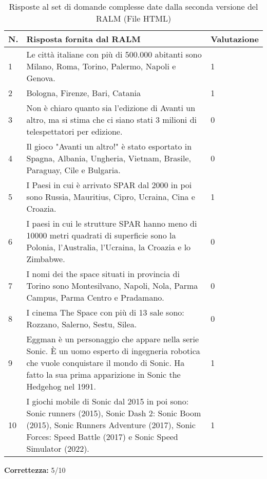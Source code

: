 \begin{table}[H]
    \centering
    \begin{tabular}{|p{0.5cm} |p{6cm} |p{2cm}|}
        \hline
        \textbf{N}. & \textbf{Risposta fornita dal RALM} & \textbf{Valutazione} \\
        \hline
        1 & Le città italiane con più di 500.000 abitanti sono Milano, Roma, Torino, Palermo, Napoli e Genova. & 1 \\
        \hline
        2 & Bologna, Firenze, Bari, Catania & 1 \\
        \hline
        3 & Non è chiaro quanto sia l'edizione di Avanti un altro, ma si stima che ci siano stati 3 milioni di telespettatori per edizione. & 0 \\
        \hline
        4 & Il gioco "Avanti un altro!" è stato esportato in Spagna, Albania, Ungheria, Vietnam, Brasile, Paraguay, Cile e Bulgaria. & 0 \\
        \hline
        5 & I Paesi in cui è arrivato SPAR dal 2000 in poi sono Russia, Mauritius, Cipro, Ucraina, Cina e Croazia. & 1 \\
        \hline
        6 & I paesi in cui le strutture SPAR hanno meno di 10000 metri quadrati di superficie sono la Polonia, l'Australia, l'Ucraina, la Croazia e lo Zimbabwe. & 0 \\
        \hline
        7 & I nomi dei the space situati in provincia di Torino sono Montesilvano, Napoli, Nola, Parma Campus, Parma Centro e Pradamano. & 0 \\
        \hline
        8 & I cinema The Space con più di 13 sale sono: Rozzano, Salerno, Sestu, Silea. & 0 \\
        \hline
        9 & Eggman è un personaggio che appare nella serie Sonic. È un uomo esperto di ingegneria robotica che vuole conquistare il mondo di Sonic. Ha fatto la sua prima apparizione in Sonic the Hedgehog nel 1991.  & 1 \\
        \hline
        10 & I giochi mobile di Sonic dal 2015 in poi sono: Sonic runners (2015), Sonic Dash 2: Sonic Boom (2015), Sonic Runners Adventure (2017), Sonic Forces: Speed Battle (2017) e Sonic Speed Simulator (2022). & 1 \\
        \hline
    \end{tabular}
    \caption{Risposte al set di domande complesse date dalla seconda versione del RALM (File HTML)}
\end{table}

\textbf{Correttezza:} 5/10

